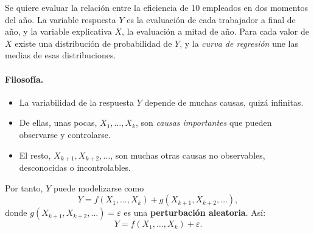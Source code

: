 \begin{ejemplo}
  Se quiere evaluar la relación entre la eficiencia de 10 empleados en dos momentos del año.
  La variable respuesta $Y$ es la evaluación de cada trabajador a final de año, y la variable
  explicativa $X$, la evaluación a mitad de año. Para cada valor de $X$ existe una
  distribución de probabilidad de $Y$, y la \emph{curva de regresión} une las medias de esas
  distribuciones.

  \begin{center}
  \end{center}
\end{ejemplo}

\paragraph{Filosofía.}
\begin{itemize}
  \item La variabilidad de la respuesta $Y$ depende de muchas causas, quizá infinitas.
  \item De ellas, unas pocas, $X_1,\ldots,X_k$, son \emph{causas importantes} que pueden
    observarse y controlarse.
  \item El resto, $X_{k+1},X_{k+2},\ldots$, son muchas otras causas no observables,
    desconocidas o incontrolables.
\end{itemize}
Por tanto, $Y$ puede modelizarse como
\[
  Y = f(X_1,\ldots,X_k) + g(X_{k+1},X_{k+2},\ldots),
\]
donde $g(X_{k+1},X_{k+2},\ldots)=\varepsilon$ es una \textbf{perturbación aleatoria}. Así:
\[
  Y = f(X_1,\ldots,X_k) + \varepsilon .
\]

